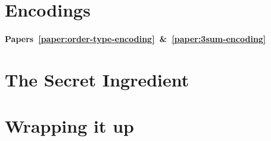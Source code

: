 \section*{Encodings}

\paragraph{Papers~\ref{paper:order-type-encoding}~\&~\ref{paper:3sum-encoding}}


\section*{The Secret Ingredient}


\section*{Wrapping it up}

